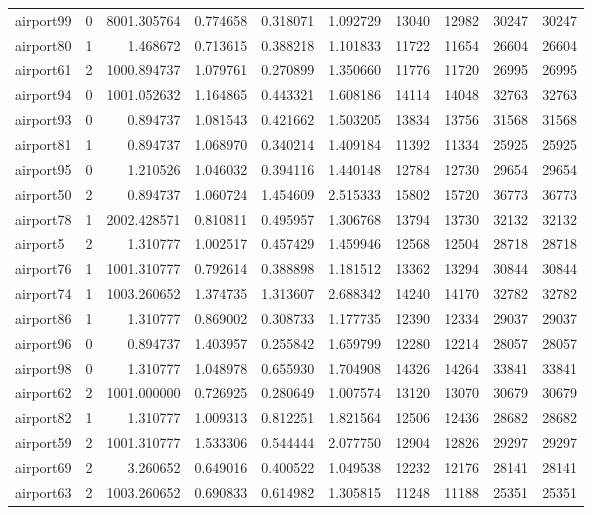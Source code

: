 \begin{longtable}{|l|r|r|r|r|r|r|r|r|r|}
airport99 & 0 & 8001.305764 & 0.774658 & 0.318071 & 1.092729 & 13040 & 12982 & 30247 & 30247 \\
airport80 & 1 & 1.468672 & 0.713615 & 0.388218 & 1.101833 & 11722 & 11654 & 26604 & 26604 \\
airport61 & 2 & 1000.894737 & 1.079761 & 0.270899 & 1.350660 & 11776 & 11720 & 26995 & 26995 \\
airport94 & 0 & 1001.052632 & 1.164865 & 0.443321 & 1.608186 & 14114 & 14048 & 32763 & 32763 \\
airport93 & 0 & 0.894737 & 1.081543 & 0.421662 & 1.503205 & 13834 & 13756 & 31568 & 31568 \\
airport81 & 1 & 0.894737 & 1.068970 & 0.340214 & 1.409184 & 11392 & 11334 & 25925 & 25925 \\
airport95 & 0 & 1.210526 & 1.046032 & 0.394116 & 1.440148 & 12784 & 12730 & 29654 & 29654 \\
airport50 & 2 & 0.894737 & 1.060724 & 1.454609 & 2.515333 & 15802 & 15720 & 36773 & 36773 \\
airport78 & 1 & 2002.428571 & 0.810811 & 0.495957 & 1.306768 & 13794 & 13730 & 32132 & 32132 \\
airport5 & 2 & 1.310777 & 1.002517 & 0.457429 & 1.459946 & 12568 & 12504 & 28718 & 28718 \\
airport76 & 1 & 1001.310777 & 0.792614 & 0.388898 & 1.181512 & 13362 & 13294 & 30844 & 30844 \\
airport74 & 1 & 1003.260652 & 1.374735 & 1.313607 & 2.688342 & 14240 & 14170 & 32782 & 32782 \\
airport86 & 1 & 1.310777 & 0.869002 & 0.308733 & 1.177735 & 12390 & 12334 & 29037 & 29037 \\
airport96 & 0 & 0.894737 & 1.403957 & 0.255842 & 1.659799 & 12280 & 12214 & 28057 & 28057 \\
airport98 & 0 & 1.310777 & 1.048978 & 0.655930 & 1.704908 & 14326 & 14264 & 33841 & 33841 \\
airport62 & 2 & 1001.000000 & 0.726925 & 0.280649 & 1.007574 & 13120 & 13070 & 30679 & 30679 \\
airport82 & 1 & 1.310777 & 1.009313 & 0.812251 & 1.821564 & 12506 & 12436 & 28682 & 28682 \\
airport59 & 2 & 1001.310777 & 1.533306 & 0.544444 & 2.077750 & 12904 & 12826 & 29297 & 29297 \\
airport69 & 2 & 3.260652 & 0.649016 & 0.400522 & 1.049538 & 12232 & 12176 & 28141 & 28141 \\
airport63 & 2 & 1003.260652 & 0.690833 & 0.614982 & 1.305815 & 11248 & 11188 & 25351 & 25351 \\

\end{longtable}
